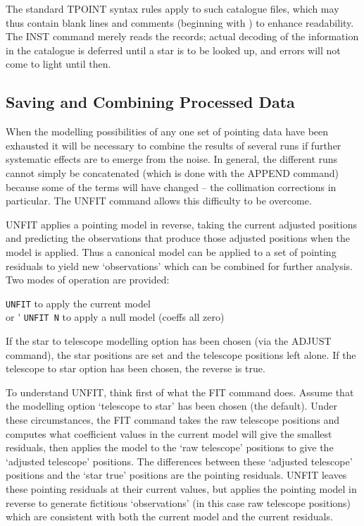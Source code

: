 The standard TPOINT syntax rules apply to such catalogue files,
which may thus contain blank lines and comments (beginning with
\fstring{!}) to enhance readability.  The INST command merely
reads the records;  actual decoding of the
information in the catalogue is deferred until a star is to be
looked up, and errors will not come to light until then.

\subsection{Saving and Combining Processed Data}
When the modelling possibilities of any one set of pointing data
have been exhausted it will be necessary to combine the results
of several runs if further systematic effects are to emerge from
the noise.  In general, the different runs cannot simply be
concatenated (which is done with the APPEND command)
because some of the terms will have
changed -- the collimation corrections in particular.  The UNFIT
command allows this difficulty to be overcome.

UNFIT applies a pointing model in reverse,
taking the current adjusted positions and predicting
the observations that produce those adjusted positions
when the model is applied.  Thus
a canonical model can be
applied to a set of pointing residuals to yield new
`observations' which can be combined for further
analysis.  Two modes of operation are provided:
\begin{cmnds}
\> \> {\tt UNFIT} \> to apply the current model \\
\> or \'\> {\tt UNFIT N} \> to apply a null model (coeffs all zero)
\end{cmnds}
If the star to telescope modelling option has been chosen
(via the ADJUST command), the star positions are set and the
telescope positions left alone.  If the telescope to star
option has been chosen, the reverse is true.

To understand UNFIT, think first of what the FIT command
does.  Assume that the modelling option `telescope to star' has
been chosen (the default).  Under these circumstances,
the FIT command takes the raw telescope positions and
computes what coefficient values in the current model
will give the smallest residuals, then applies the model
to the `raw telescope' positions to give the `adjusted
telescope' positions.  The differences between these
`adjusted telescope' positions and the `star true'
positions are the pointing residuals.
UNFIT leaves these pointing residuals at their current
values, but applies the pointing model in reverse to
generate fictitious `observations' (in this case raw
telescope positions) which are consistent with both
the current model and the current residuals.


